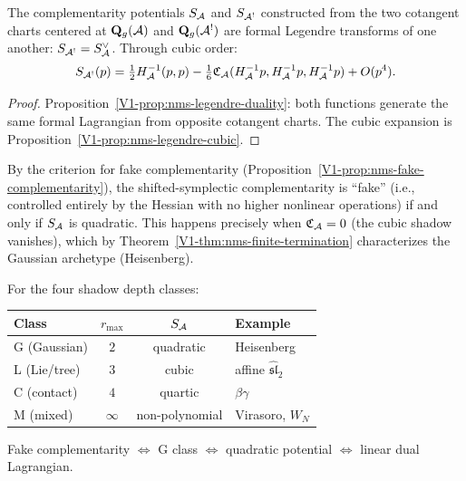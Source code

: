 \begin{proposition}
The complementarity potentials $S_{\mathcal{A}}$ and $S_{\mathcal{A}^!}$
constructed from the two cotangent charts centered at
$\mathbf{Q}_g(\mathcal{A})$ and $\mathbf{Q}_g(\mathcal{A}^!)$ are formal
Legendre transforms of one another:
$S_{\mathcal{A}^!} = S_{\mathcal{A}}^{\vee}$.
Through cubic order:
\begin{equation}%
S_{\cA^!}(p)
= \tfrac{1}{2} H_\cA^{-1}(p, p)
- \tfrac{1}{6}
 \mathfrak{C}_\cA(H_\cA^{-1}p, H_\cA^{-1}p, H_\cA^{-1}p)
+ O(p^4).
\end{equation}
\end{proposition}

\begin{proof}
Proposition~\ref{V1-prop:nms-legendre-duality}: both functions
generate the same formal Lagrangian from opposite cotangent
charts. The cubic expansion is
Proposition~\ref{V1-prop:nms-legendre-cubic}.
\end{proof}

\begin{remark}
By the criterion for fake complementarity
(Proposition~\ref{V1-prop:nms-fake-complementarity}), the
shifted-symplectic complementarity is ``fake'' (i.e.,
controlled entirely by the Hessian with no higher nonlinear
operations) if and only if $S_{\mathcal{A}}$ is quadratic.
This happens precisely when $\mathfrak{C}_{\mathcal{A}} = 0$
(the cubic shadow vanishes), which by
Theorem~\ref{V1-thm:nms-finite-termination} characterizes
the Gaussian archetype (Heisenberg).

For the four shadow depth classes:
\begin{center}
\renewcommand{\arraystretch}{1.2}
\begin{tabular}{l@{\quad}c@{\quad}c@{\quad}l}
\textbf{Class} & $r_{\max}$ & $S_{\mathcal{A}}$ & \textbf{Example} \\
\midrule
G (Gaussian) & $2$ & quadratic & Heisenberg \\
L (Lie/tree) & $3$ & cubic & affine $\widehat{\mathfrak{sl}}_2$ \\
C (contact) & $4$ & quartic & $\beta\gamma$ \\
M (mixed) & $\infty$ & non-polynomial & Virasoro, $W_N$ \\
\end{tabular}
\end{center}
Fake complementarity $\Leftrightarrow$ G class
$\Leftrightarrow$ quadratic potential $\Leftrightarrow$
linear dual Lagrangian.
\end{remark}

